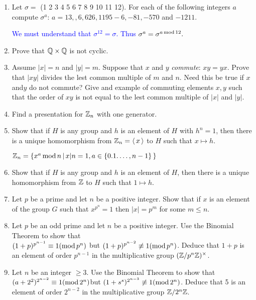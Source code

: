 \documentclass[10pt,a4paper]{report}
\newcommand{\BLUE}[1]{\textcolor{blue}{#1}}
\begin{document}
\begin{enumerate}
	\item Let $\sigma = $ (1 2 3 4 5 6 7 8 9 10 11 12).  For each of the following integers $a$ compute $\sigma^a$: $a=13, ,6,626,1195-6,-81,-570$ and $-1211$.
	
	\BLUE{We must understand that $\sigma^{12} = \sigma$.  Thus $\sigma^a = \sigma^{a \operatorname{mod} 12}.$
	}
	
	\item Prove that $\mathbb{Q}\times\mathbb{Q}$ is not cyclic.
	
	\item Assume $|x|=n$ and $|y|=m$.  Suppose that $x$ and $y$ \textit{commute}: $xy=yx$.  Prove that $|xy|$ divides the lest common multiple of $m$ and $n$.  Need this be true if $x$ and$y$ do not commute?  Give and example of commuting elements $x,y$ such that the order of $xy$ is not equal to the lest common multiple of $|x|$ and $|y|$.
	
	\item Find a presentation for $\mathbb{Z}_n$ with one generator.
	
	\item Show that if $H$ is any group and $h$ is an element of $H$ with $h^n=1$, then there is a unique homomorphism from $\mathbb{Z}_n=\left \langle\, x \,\right \rangle$ to $H$ such that $x \mapsto h$.
	
	\BLUE{$\mathbb{Z}_n = \{x^a\operatorname{mod} n\,|\, x|n=1, a \in \{0.1.\dots,n-1\}\,\}$
	}
	
	\item Show that if $H$ is any group and $h$ is an element of $H$, then there is a unique homomorphism from $\mathbb{Z}$ to $H$ such that $1 \mapsto h$.
	
	\item Let $p$ be a prime and let $n$ be a positive integer.  Show that if $x$ is an element of the group $G$ such that $x^{p^n}=1$ then $|x|=p^m$ for some $m \le n$.
	
	\item Let $p$ be an odd prime and let $n$ be a positive integer.  Use the Binomial Theorem to show that \\$(1+p)^{p^{n-1}} \equiv 1(\operatorname{mod} p^n)$ but $(1+p)^{p^{n-2}} \not \equiv 1(\operatorname{mod} p^n)$.  Deduce that $1+p$ is an element of order $p^{n-1}$ in the multiplicative group $(\mathbb{Z}/p^n\mathbb{Z})^\times$.
	
	\item Let $n$ be an integer $\ge 3$.  Use the Binomial Theorem to show that $(a+2^2)^{2^{n-2}}\equiv 1(\operatorname{mod} 2^n)$but $(1+s^s)^{2^{n-3}}\not\equiv 1(\operatorname{mod} 2^n)$.  Deduce that 5 is an element of order $2^{n-2}$ in the multiplicative group $\mathbb{Z}/2^n\mathbb{Z}$.
	

\end{enumerate}
\end{document}
